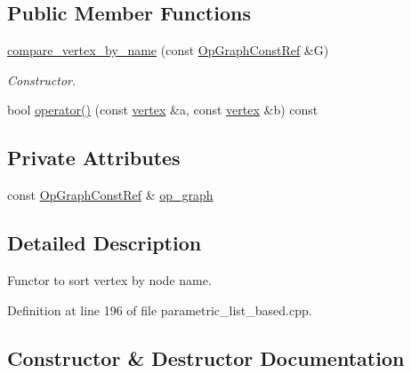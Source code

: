 \subsection*{Public Member Functions}
\begin{DoxyCompactItemize}
\item 
\hyperlink{classcompare__vertex__by__name_a05d2998c535de5c815874a018411d5bd}{compare\+\_\+vertex\+\_\+by\+\_\+name} (const \hyperlink{op__graph_8hpp_a9a0b240622c47584bee6951a6f5de746}{Op\+Graph\+Const\+Ref} \&G)
\begin{DoxyCompactList}\small\item\em Constructor. \end{DoxyCompactList}\item 
bool \hyperlink{classcompare__vertex__by__name_a53d391ede2a6ca7f3502e1fd84aefe96}{operator()} (const \hyperlink{graph_8hpp_abefdcf0544e601805af44eca032cca14}{vertex} \&a, const \hyperlink{graph_8hpp_abefdcf0544e601805af44eca032cca14}{vertex} \&b) const
\end{DoxyCompactItemize}
\subsection*{Private Attributes}
\begin{DoxyCompactItemize}
\item 
const \hyperlink{op__graph_8hpp_a9a0b240622c47584bee6951a6f5de746}{Op\+Graph\+Const\+Ref} \& \hyperlink{classcompare__vertex__by__name_a16fa767f268ea728fa0f8567fa87f7ad}{op\+\_\+graph}
\end{DoxyCompactItemize}


\subsection{Detailed Description}
Functor to sort vertex by node name. 

Definition at line 196 of file parametric\+\_\+list\+\_\+based.\+cpp.



\subsection{Constructor \& Destructor Documentation}
\mbox{\label{classcompare__vertex__by__name_a05d2998c535de5c815874a018411d5bd}} 
